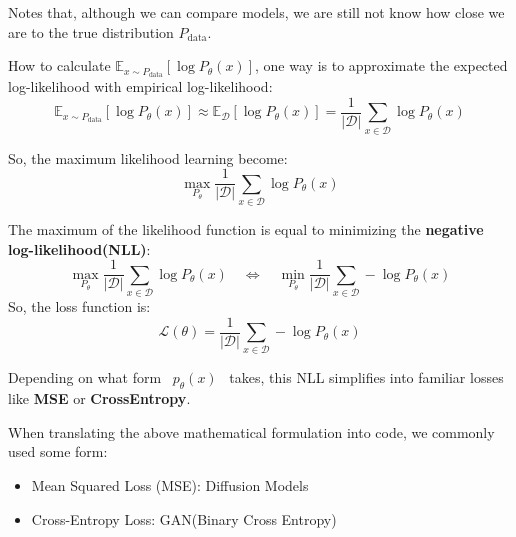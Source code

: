 \documentclass[
  12pt,
]{article}
\providecommand{\tightlist}{%
  \setlength{\itemsep}{0pt}\setlength{\parskip}{0pt}}\usepackage{longtable,booktabs,array}
\theoremstyle{plain}
\theoremstyle{remark}
\begin{document}
\begin{tcolorbox}[enhanced jigsaw, toprule=.15mm, colframe=quarto-callout-note-color-frame, bottomrule=.15mm, rightrule=.15mm, colbacktitle=quarto-callout-note-color!10!white, opacitybacktitle=0.6, colback=white, arc=.35mm, bottomtitle=1mm, left=2mm, leftrule=.75mm, breakable, title=\textcolor{quarto-callout-note-color}{\faInfo}\hspace{0.5em}{Note}, titlerule=0mm, toptitle=1mm, opacityback=0, coltitle=black]

Notes that, although we can compare models, we are still not know how
close we are to the true distribution \(P_{\text{data}}\).

\end{tcolorbox}

How to calculate
\(\mathbb{E}_{x \sim P_{\text{data}}} [\log P_{\theta}(x)]\), one way is
to approximate the expected log-likelihood with empirical
log-likelihood: \[
\mathbb{E}_{x \sim P_{\text{data}}} [\log P_{\theta}(x)] \approx \mathbb{E}_{\mathcal{D}}[\log P_{\theta}(x)]  
= \frac{1}{|\mathcal{D}|} \sum_{x \in \mathcal{D}} \log P_{\theta}(x)
\]

So, the maximum likelihood learning become: \[
\underset{P_{\theta}}{\max}  \frac{1}{|\mathcal{D}|} \sum_{x \in \mathcal{D}} \log P_{\theta}(x)
\]

The maximum of the likelihood function is equal to minimizing the
\textbf{negative log-likelihood(NLL)}: \[
\underset{P_{\theta}}{\max}  \frac{1}{|\mathcal{D}|} \sum_{x \in \mathcal{D}} \log P_{\theta}(x)   
\quad \Longleftrightarrow \quad
\underset{P_{\theta}}{\min} \frac{1}{|\mathcal{D}|} \sum_{x \in \mathcal{D}} -\log P_{\theta}(x) 
\] So, the loss function is: \[
\mathcal{L}(\theta) = \frac{1}{|\mathcal{D}|} \sum_{x \in \mathcal{D}} -\log P_{\theta}(x) 
\]

Depending on what form~ \(p_\theta(x)\)~ takes, this NLL simplifies into
familiar losses like \textbf{MSE} or \textbf{CrossEntropy}.

When translating the above mathematical formulation into code, we
commonly used some form:

\begin{itemize}
\tightlist
\item
  Mean Squared Loss (MSE): Diffusion Models
\item
  Cross-Entropy Loss: GAN(Binary Cross Entropy)
\end{itemize}
\end{document}
